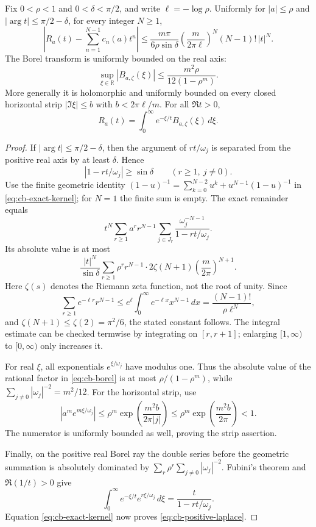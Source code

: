 \begin{theorem}
\label{thm:cb-gevery-laplace}
Fix $0<\rho<1$ and $0<\delta<\pi/2$, and write
$\ell=-\log\rho$.  Uniformly for $|a|\leq\rho$ and
$|\arg t|\leq\pi/2-\delta$, for every integer $N\geq1$,
\begin{equation}
 \left|R_a(t)-\sum_{n=1}^{N-1}c_n(a)t^n\right|
 \leq
 \frac{m\pi}{6\rho\sin\delta}
 \left(\frac{m}{2\pi\ell}\right)^N
 (N-1)!\,|t|^N.
 \label{eq:cb-gevery-bound}
\end{equation}
The Borel transform is uniformly bounded on the real axis:
\begin{equation}
 \sup_{\xi\in\mathbb R}|B_{a,\zeta}(\xi)|
 \leq \frac{m^2\rho}{12(1-\rho^m)}.
 \label{eq:cb-real-bound}
\end{equation}
More generally it is holomorphic and uniformly bounded on every closed
horizontal strip $|\Im\xi|\leq b$ with
$b<2\pi\ell/m$.  For all $\Re t>0$,
\begin{equation}
 R_a(t)=\int_0^{\infty}e^{-\xi/t}B_{a,\zeta}(\xi)\,d\xi.
 \label{eq:cb-positive-laplace}
\end{equation}
\end{theorem}

\begin{proof}
If $|\arg t|\leq\pi/2-\delta$, then the argument of $rt/\omega_j$
is separated from the positive real axis by at least $\delta$.  Hence
\[
 |1-rt/\omega_j|\geq\sin\delta
 \qquad(r\geq1,\ j\ne0).
\]
Use the finite geometric identity
$ (1-u)^{-1}=\sum_{k=0}^{N-2}u^k+u^{N-1}(1-u)^{-1}$
in \eqref{eq:cb-exact-kernel}; for $N=1$ the finite sum is empty.
The exact remainder equals
\[
 t^N\sum_{r\geq1}a^r r^{N-1}
       \sum_{j\in J_r}
        \frac{\omega_j^{-N-1}}{1-rt/\omega_j}.
\]
Its absolute value is at most
\[
 \frac{|t|^N}{\sin\delta}
 \sum_{r\geq1}\rho^r r^{N-1}
 \cdot 2\zeta(N+1)\left(\frac{m}{2\pi}\right)^{N+1}.
\]
Here $\zeta(s)$ denotes the Riemann zeta function, not the root of unity.
Since
\[
 \sum_{r\geq1}e^{-\ell r}r^{N-1}
 \leq e^{\ell}\int_0^{\infty}e^{-\ell x}x^{N-1}\,dx
 =\frac{(N-1)!}{\rho\ell^N},
\]
and $\zeta(N+1)\leq\zeta(2)=\pi^2/6$, the stated constant follows.
The integral estimate can be checked termwise by integrating on
$[r,r+1]$; enlarging $[1,\infty)$ to $[0,\infty)$ only increases it.

For real $\xi$, all exponentials $e^{\xi/\omega_j}$ have modulus one.
Thus the absolute value of the rational factor in
\eqref{eq:cb-borel} is at most $\rho/(1-\rho^m)$, while
$\sum_{j\ne0}|\omega_j|^{-2}=m^2/12$.
For the horizontal strip, use
\[
 |a^m e^{m\xi/\omega_j}|
 \leq \rho^m\exp\!\left(\frac{m^2b}{2\pi|j|}\right)
 \leq \rho^m\exp\!\left(\frac{m^2b}{2\pi}\right)<1.
\]
The numerator is uniformly bounded as well, proving the strip assertion.

Finally, on the positive real Borel ray the double series before the
geometric summation is absolutely dominated by
$\sum_r\rho^r\sum_{j\ne0}|\omega_j|^{-2}$.
Fubini's theorem and $\Re(1/t)>0$ give
\[
 \int_0^{\infty}e^{-\xi/t}e^{r\xi/\omega_j}\,d\xi
 =\frac{t}{1-rt/\omega_j}.
\]
Equation \eqref{eq:cb-exact-kernel} now proves
\eqref{eq:cb-positive-laplace}.
\end{proof}

